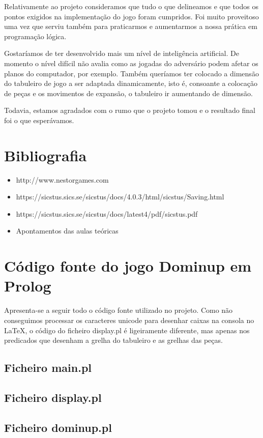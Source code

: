 \documentclass[a4paper]{article}
\begin{document}
Relativamente ao projeto consideramos que tudo o que delineamos e que todos os pontos exigidos na implementação do jogo foram cumpridos. Foi muito proveitoso uma vez que serviu também para praticarmos e aumentarmos a nossa prática em programação lógica.

Gostaríamos de ter desenvolvido mais um nível de inteligência artificial. De momento o nível difícil não avalia como as jogadas do adversário podem afetar os planos do computador, por exemplo. Também queríamos ter colocado a dimensão do tabuleiro de jogo a ser adaptada dinamicamente, isto é, consoante a colocação de peças e os movimentos de expansão, o tabuleiro ir aumentando de dimensão.

Todavia, estamos agradados com o rumo que o projeto tomou e o resultado final foi o que esperávamos.


\clearpage
\section{Bibliografia}
\begin{itemize}
	\item http://www.nestorgames.com
	\item https://sicstus.sics.se/sicstus/docs/4.0.3/html/sicstus/Saving.html
	\item https://sicstus.sics.se/sicstus/docs/latest4/pdf/sicstus.pdf
	\item Apontamentos das aulas teóricas
\end{itemize}

\newpage
\appendix
\section{Código fonte do jogo Dominup em Prolog}
\label{codigo}

Apresenta-se a seguir todo o código fonte utilizado no projeto. Como não conseguimos processar os caracteres unicode para desenhar caixas na consola no \LaTeX, o código do ficheiro display.pl é ligeiramente diferente, mas apenas nos predicados que desenham a grelha do tabuleiro e as grelhas das peças.

\subsection{Ficheiro main.pl}


\subsection{Ficheiro display.pl}


\subsection{Ficheiro dominup.pl}

\end{document}
